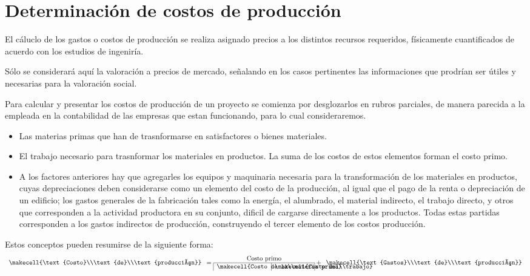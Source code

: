 \section{Determinación de costos de producción}
El cáluclo de los gastos o costos de producción se realiza asignado precios a los distintos
recursos requeridos, físicamente cuantificados de acuerdo con los estudios de ingeniría.

Sólo se considerará aquí la valoración a precios de mercado, señalando en los casos
pertinentes las informaciones que prodrían ser útiles y necesarias para la valoración social.

Para calcular y presentar los costos de producción de un proyecto se comienza por desglozarlos
en rubros parciales, de manera parecida a la empleada en la contabilidad de las empresas
que estan funcionando, para lo cual consideraremos.
\begin{itemize}
    \item Las materias primas que han de trasnformarse en satisfactores o bienes materiales.
    \item El trabajo necesario para trasnformar los materiales en productos. La suma de los
    costos de estos elementos forman el costo primo.
    \item A los factores anteriores hay que agregarles los equipos y maquinaria necesaria
    para la transformación de los materiales en productos, cuyas depreciaciones deben
    considerarse como un elemento del costo de la producción, al igual que el pago de la
    renta o depreciación de un edificio; los gastos generales de la fabricación tales como
    la energía, el alumbrado, el material indirecto, el trabajo directo, y otros que corresponden
    a la actividad productora en su conjunto, dificil de cargarse directamente a los productos.
    Todas estas partidas corresponden a los gastos indirectos de producción, construyendo el
    tercer elemento de los costos producción.
\end{itemize}

Estos conceptos pueden resumirse de la siguiente forma:
\begin{equation}
    \begin{array}{c} 
        \makecell{\text{Costo}\\\text{de}\\\text{producción}}
    \end{array}
    = 
    \begin{array}{|p{2.8cm}|p{2cm}|} %
        \multicolumn{2}{c}{\text{Costo primo}} \\ \hline
        \makecell{Costo de la\\materia prima} & \makecell{Costo del\\trabajo}
    \end{array}
    +
    \begin{array}{c}
        \makecell{\text{Gastos}\\\text{de}\\\text{producción}}
    \end{array}
\end{equation}

